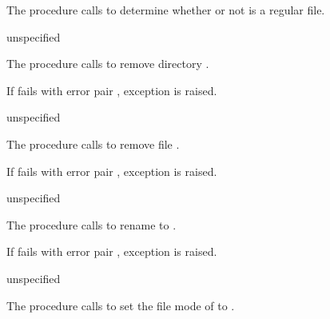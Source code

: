 The  procedure calls 
to determine whether or not  is a regular file.

\begin{procedure}
\end{procedure}
\returns{} unspecified

The  procedure calls
 to remove directory .

If  fails with error pair
, exception  is raised.

\begin{procedure}
\end{procedure}
\returns{} unspecified

The  procedure calls  to remove
file .

If  fails with error pair , exception  is raised.

\begin{procedure}
\end{procedure}
\returns{} unspecified

The  procedure calls  to rename
 to .

If  fails with error pair , exception  is raised.

\begin{procedure}
\end{procedure}
\returns{} unspecified

The  procedure calls  to set the
file mode of  to .

